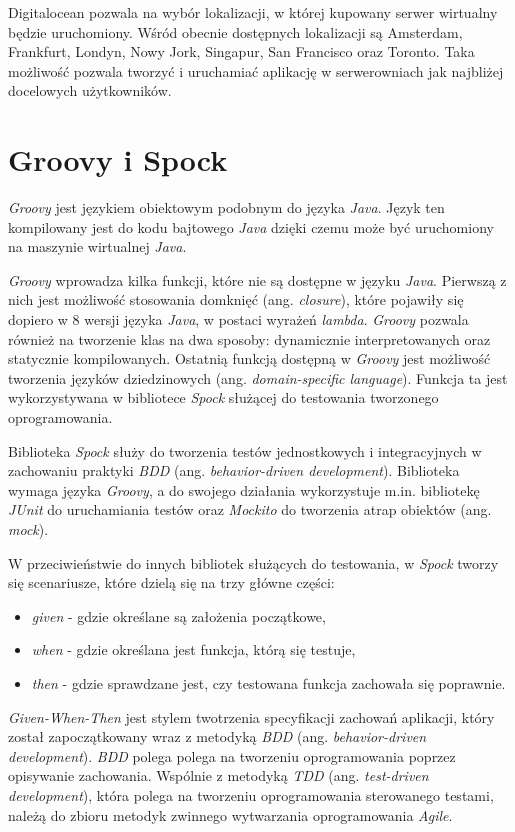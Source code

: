 Digitalocean pozwala na wybór lokalizacji, w której kupowany serwer wirtualny będzie uruchomiony. Wśród obecnie dostępnych lokalizacji są Amsterdam, Frankfurt, Londyn, Nowy Jork, Singapur, San Francisco oraz Toronto. Taka możliwość pozwala tworzyć i uruchamiać aplikację w serwerowniach jak najbliżej docelowych użytkowników. 

\section{Groovy i Spock}

\textsl{Groovy} jest językiem obiektowym podobnym do języka \textsl{Java}. Język ten kompilowany jest do kodu bajtowego \textsl{Java} dzięki czemu może być uruchomiony na maszynie wirtualnej \textsl{Java}. 

\textsl{Groovy} wprowadza kilka funkcji, które nie są dostępne w języku \textsl{Java}. Pierwszą z nich jest możliwość stosowania domknięć (ang. \textsl{closure}), które pojawiły się dopiero w 8 wersji języka \textsl{Java}, w postaci wyrażeń \textsl{lambda}. \textsl{Groovy} pozwala również na tworzenie klas na dwa sposoby: dynamicznie interpretowanych oraz statycznie kompilowanych. Ostatnią funkcją dostępną w \textsl{Groovy} jest możliwość tworzenia języków dziedzinowych (ang. \textsl{domain-specific language}). Funkcja ta jest wykorzystywana w bibliotece \textsl{Spock} służącej do testowania tworzonego oprogramowania.

Biblioteka \textsl{Spock} służy do tworzenia testów jednostkowych i integracyjnych w zachowaniu praktyki \textsl{BDD} (ang. \textsl{behavior-driven development}). Biblioteka wymaga języka \textsl{Groovy}, a do swojego działania wykorzystuje m.in. bibliotekę \textsl{JUnit} do uruchamiania testów oraz \textsl{Mockito} do tworzenia atrap obiektów (ang. \textsl{mock}). 

W przeciwieństwie do innych bibliotek służących do testowania, w \textsl{Spock} tworzy się scenariusze, które dzielą się na trzy główne części: 
\begin{itemize}
    \item \textsl{given} - gdzie określane są założenia początkowe,
    \item \textsl{when} - gdzie określana jest funkcja, którą się testuje,
    \item \textsl{then} - gdzie sprawdzane jest, czy testowana funkcja zachowała się poprawnie.
\end{itemize}
\textsl{Given-When-Then} jest stylem twotrzenia specyfikacji zachowań aplikacji, który został zapoczątkowany wraz z metodyką \textsl{BDD} (ang. \textsl{behavior-driven development}). \textsl{BDD} polega polega na tworzeniu oprogramowania poprzez opisywanie zachowania. Wspólnie z metodyką \textsl{TDD} (ang. \textsl{test-driven development}), która polega na tworzeniu oprogramowania sterowanego testami, należą do zbioru metodyk zwinnego wytwarzania oprogramowania \textsl{Agile}.